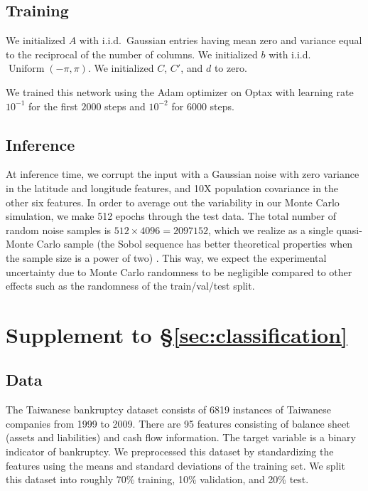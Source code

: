 \documentclass{article}
\begin{document}
\subsection{Training}
We initialized \(A\) with i.i.d.~Gaussian entries having mean zero and variance equal to the reciprocal of the number of columns.
We initialized \(b\) with i.i.d.~\(\operatorname{Uniform}(-\pi, \pi)\).
We initialized \(C\), \(C'\), and \(d\) to zero.

We trained this network using the Adam optimizer on Optax \citep{deepmind_deepmind_2020} with learning rate \(10^{-1}\) for the first \(2000\) steps and \(10^{-2}\) for \(6000\) steps.

\subsection{Inference}
At inference time, we corrupt the input with a Gaussian noise with zero variance in the latitude and longitude features, and 10X population covariance in the other six features.
In order to average out the variability in our Monte Carlo simulation, we make 512 epochs through the test data.
The total number of random noise samples is \(512 \times 4096 = 2097152\), which we realize as a single quasi-Monte Carlo sample (the Sobol sequence has better theoretical properties when the sample size is a power of two) \citep{virtanen_scipy_2020}.
This way, we expect the experimental uncertainty due to Monte Carlo randomness to be negligible compared to other effects such as the randomness of the train/val/test split.

\clearpage
\section{Supplement to \S\ref{sec:classification}}
\label{app:classification}
\subsection{Data}
The Taiwanese bankruptcy dataset \citep{unknown_taiwanese_2020,liang_financial_2016} consists of 6819 instances of Taiwanese companies from 1999 to 2009.
There are 95 features consisting of balance sheet (assets and liabilities) and cash flow information.
The target variable is a binary indicator of bankruptcy.
We preprocessed this dataset by standardizing the features using the means and standard deviations of the training set.
We split this dataset into roughly 70\% training, 10\% validation, and 20\% test.
\end{document}
